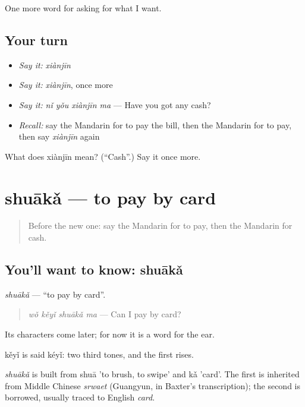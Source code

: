 \begin{grammarlens}[title={What you've built}]
One more word for asking for what I want.
\end{grammarlens}

\subsection*{Your turn}
\begin{itemize}
\raggedright
  \item \emph{Say it:} \emph{xiànjīn}
  \item \emph{Say it:} \emph{xiànjīn}, once more
  \item \emph{Say it:} \emph{nǐ yǒu xiànjīn ma} — Have you got any cash?
  \item \emph{Recall:} say the Mandarin for to pay the bill, then the Mandarin for to pay, then say \emph{xiànjīn} again
\end{itemize}

\begin{tcolorbox}[breakable,colback=teal!4,colframe=teal!35!black,title={Before you move on}]
What does xiànjīn mean? (\textquotedblleft{}Cash\textquotedblright{}.) Say it once more.
\end{tcolorbox}
\section[shuākǎ]{shuākǎ — to pay by card}

\label{lesson:ZH-C114-shuaka}



\begin{quote}
Before the new one: say the Mandarin for to pay, then the Mandarin for cash.
\end{quote}

\subsection*{You'll want to know: shuākǎ}
\emph{shuākǎ} — \textquotedblleft{}to pay by card\textquotedblright{}.

\begin{quote}
\emph{wǒ kěyǐ shuākǎ ma} — Can I pay by card?
\end{quote}

Its characters come later; for now it is a word for the ear.

kěyǐ is said kéyǐ: two third tones, and the first rises.

\begin{cousinweb}
\emph{shuākǎ} is built from shuā 'to brush, to swipe' and kǎ 'card'. The first is inherited from Middle Chinese \emph{srwaet} (Guangyun, in Baxter's transcription); the second is borrowed, usually traced to English \emph{card}.
\end{cousinweb}

